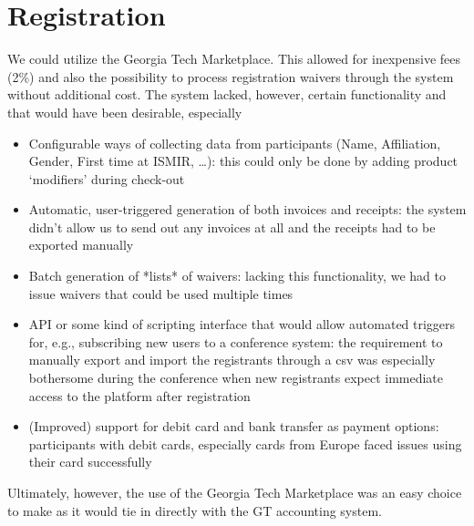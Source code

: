 \documentclass[%
10pt,								%
]
{scrartcl}
\begin{document}
        
\section{Registration}
    We could utilize the Georgia Tech Marketplace. This allowed for inexpensive fees (2\%) and also the possibility to process registration waivers through the system without additional cost. The system lacked, however, certain functionality and that would have been desirable, especially
    \begin{itemize}
        \item   Configurable ways of collecting data from participants (Name, Affiliation, Gender, First time at ISMIR, …): this could only be done by adding product ‘modifiers’ during check-out
        \item   Automatic, user-triggered generation of both invoices and receipts: the system didn’t allow us to send out any invoices at all and the receipts had to be exported manually 
        \item   Batch generation of *lists* of waivers: lacking this functionality, we had to issue waivers that could be used multiple times
        \item   API or some kind of scripting interface that would allow automated triggers for, e.g., subscribing new users to a conference system: the requirement to manually export and import the registrants through a csv was especially bothersome during the conference when new registrants expect immediate access to the platform after registration
        \item   (Improved) support for debit card and bank transfer as payment options: participants with debit cards, especially cards from Europe faced issues using their card successfully
    \end{itemize}
Ultimately, however, the use of the Georgia Tech Marketplace was an easy choice to make as it would tie in directly with the GT accounting system.
\end{document}
